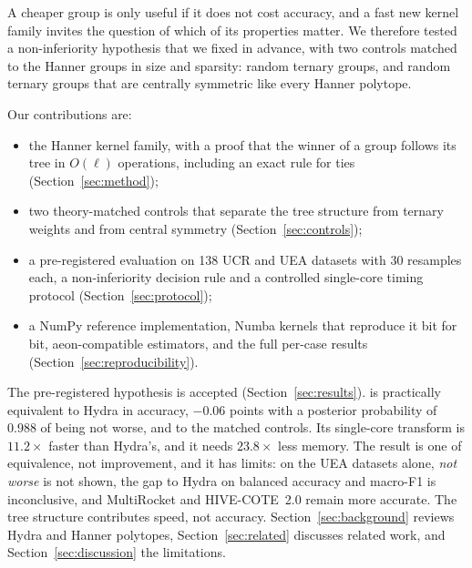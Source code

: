 A cheaper group is only useful if it does not cost accuracy, and a fast new kernel family
invites the question of which of its properties matter. We therefore tested a
non-inferiority hypothesis that we fixed in advance, with two controls matched to the
Hanner groups in size and sparsity: random ternary groups, and random ternary groups that
are centrally symmetric like every Hanner polytope.

Our contributions are:
\begin{itemize}
\item the Hanner kernel family, with a proof that the winner of a group follows its tree in
  $O(\ell)$ operations, including an exact rule for ties (Section~\ref{sec:method});
\item two theory-matched controls that separate the tree structure from ternary weights
  and from central symmetry (Section~\ref{sec:controls});
\item a pre-registered evaluation on 138 UCR and UEA datasets with 30 resamples each, a
  non-inferiority decision rule and a controlled single-core timing protocol
  (Section~\ref{sec:protocol});
\item a NumPy reference implementation, Numba kernels that reproduce it bit for bit,
  aeon-compatible estimators, and the full per-case results (Section~\ref{sec:reproducibility}).
\end{itemize}

The pre-registered hypothesis is accepted (Section~\ref{sec:results}). \hh{} is practically
equivalent to Hydra in accuracy, $-0.06$ points with a posterior probability of 0.988 of
being not worse, and to the matched controls. Its single-core transform is $11.2\times$
faster than Hydra's, and it needs $23.8\times$ less memory. The result is one of
equivalence, not improvement, and it has limits: on the UEA datasets alone, \emph{not
worse} is not shown, the gap to Hydra on balanced accuracy and macro-F1 is inconclusive,
and MultiRocket and HIVE-COTE~2.0 remain more accurate. The tree structure contributes
speed, not accuracy. Section~\ref{sec:background} reviews Hydra and Hanner polytopes,
Section~\ref{sec:related} discusses related work, and Section~\ref{sec:discussion} the
limitations.
